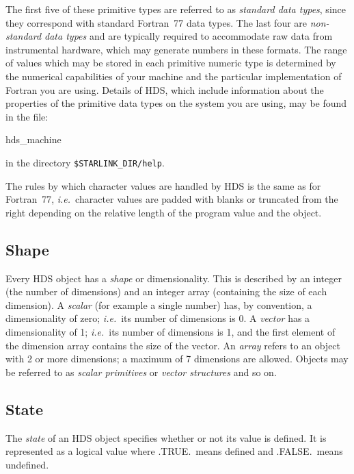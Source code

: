 \documentclass[twoside,11pt]{starlink}
\providecommand{\st}[1]{{\emph{#1}}}
\begin{document}
The first five of these primitive types are referred to as
\st{standard data types}, since they correspond with standard
Fortran~77 data types. The last four are \st{non-standard data types}
and are typically required to accommodate raw data from instrumental
hardware, which may generate numbers in these formats.  The range of
values which may be stored in each primitive numeric type is
determined by the numerical capabilities of your machine and the
particular implementation of Fortran you are using. Details of HDS,
which include information about the properties of the primitive data
types on the system you are using, may be found in the file:

\begin{small}
\begin{terminalv}
hds_machine
\end{terminalv}
\end{small}


in the directory \texttt{\$STARLINK\_DIR/help}.

The rules by which character values are handled by HDS is the same as
for Fortran~77, \st{i.e.}\ character values are padded with blanks or
truncated from the right depending on the relative length of the
program value and the object.

\subsection{\label{sect:shape}Shape}

Every HDS object has a \st{shape} or dimensionality. This is
described by an integer (the number of dimensions) and an integer
array (containing the size of each dimension). A \st{scalar} (for
example a single number) has, by convention, a dimensionality of zero;
\st{i.e.}\ its number of dimensions is 0. A \st{vector} has a
dimensionality of 1; \st{i.e.}\ its number of dimensions is 1, and
the first element of the dimension array contains the size of the
vector.  An \st{array} refers to an object with 2 or more dimensions;
a maximum of 7 dimensions are allowed. Objects may be referred to as
\st{scalar primitives} or \st{vector structures} and so on.

\subsection{State}

The \st{state} of an HDS object specifies whether or not its value is
defined. It is represented as a logical value where .TRUE.\ means
defined and .FALSE.\ means undefined.
\end{document}
